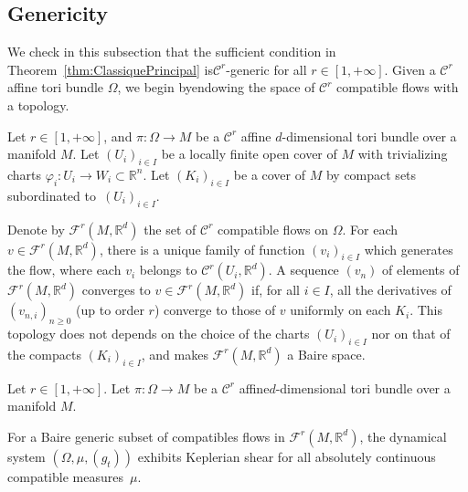 \documentclass[AHL,Unicode,longabstracts]{cedram}
\newcommand{\R}{\mathbb{R}}
\newcommand{\Ccal}{\mathcal{C}}
\newcommand{\Fcal}{\mathcal{F}}
\begin{document}
\subsection{Genericity}\label{subsec:FlotTM}


We check in this subsection that the sufficient condition in Theorem~\ref{thm:ClassiquePrincipal} is\linebreak$\Ccal^r$-generic for all $r \in [1, +\infty]$. Given a $\Ccal^r$ affine tori bundle $\Omega$, we begin by\linebreak endowing the space of $\Ccal^r$ compatible flows with a topology.


Let $r \in [1, +\infty]$, and $\pi: \Omega \to M$ be a $\Ccal^r$ affine $d$-dimensional tori bundle over a manifold $M$. Let $(U_i)_{i \in I}$ be a locally finite open cover of $M$ with trivializing charts $\varphi_i : U_i \to W_i \subset \R^n$. Let $(K_i)_{i \in I}$ be a cover of $M$ by compact sets subordinated to~$(U_i)_{i \in I}$.


Denote by $\Fcal^r (M, \R^d)$ the set of $\Ccal^r$ compatible flows on $\Omega$. For each $v \in \Fcal^r (M, \R^d)$, there is a unique family of function $(v_i)_{i \in I}$ which generates the flow, where each $v_i$ belongs to $\Ccal^r (U_i,\R^d)$. A sequence $(v_n)$ of elements of $\Fcal^r (M, \R^d)$ converges to $v \in \Fcal^r (M, \R^d)$ if, for all $i \in I$, all the derivatives of $(v_{n,i})_{n \geq 0}$ (up to order $r$) converge to those of $v$ uniformly on each $K_i$. This topology does not depends on the choice of the charts $(U_i)_{i \in I}$ nor on that of the compacts $(K_i)_{i \in I}$, and makes $\Fcal^r (M, \R^d)$ a Baire space.


\begin{prop}\label{prop:BaireGenericite}

Let $r \in [1, +\infty]$. Let $\pi: \Omega \to M$ be a $\Ccal^r$ affine\linebreak$d$-dimensional tori bundle over a manifold $M$.


For a Baire generic subset of compatibles flows in $\Fcal^r (M, \R^d)$, the dynamical system $(\Omega, \mu, (g_t))$ exhibits Keplerian shear for all absolutely continuous compatible measures~$\mu$.
\end{prop}
\end{document}
